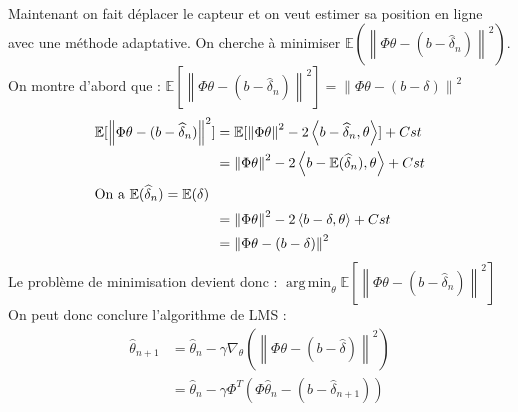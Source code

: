 \documentclass{article}
\begin{document}
\paragraph{} Maintenant on fait d\'eplacer le capteur et on veut estimer sa position en ligne avec une m\'ethode adaptative. On cherche \`a minimiser $\mathbb{E}(\left\|\Phi\theta - (b - \widehat{\delta}_{n})\right\|^{2})$.
On montre d'abord que : $\mathbb{E}[\left\|\Phi\theta - (b - \widehat{\delta}_{n})\right\|^{2}] = \left\|\Phi\theta - (b - \delta)\right\|^{2} $
\begin{align*}
\mathbb{E}[\left\|\Phi\theta - (b - \widehat{\delta}_{n})\right\|^{2}] &= \mathbb{E}[\left\|\Phi\theta\right\|^{2}-2\left\langle b-\widehat{\delta}_{n},\theta\right\rangle] + Cst \\
          &= \left\|\Phi\theta\right\|^{2} -2\left\langle b-\mathbb{E}(\widehat{\delta}_{n}),\theta\right\rangle + Cst \\
					\intertext{On a $\mathbb{E}(\widehat{\delta}_{n})=\mathbb{E}(\delta)$}
					&= \left\|\Phi\theta\right\|^{2} -2\left\langle b-\delta,\theta\right\rangle + Cst \\
					&= \left\|\Phi\theta - (b - \delta)\right\|^{2} 
\end{align*}
Le probl\`eme de minimisation devient donc : $\operatorname{arg\,min}_\theta \mathbb{E}[\left\|\Phi\theta - (b - \widehat{\delta}_{n})\right\|^{2}] $
On peut donc conclure l'algorithme de LMS :
\begin{align*}
\widehat{\theta}_{n+1} &= \widehat{\theta}_{n} - \gamma\nabla_{\theta}(\left\|\Phi\theta - (b - \widehat{\delta})\right\|^{2}) \\
											 &= \widehat{\theta}_{n} - \gamma\Phi^{T}(\Phi\widehat{\theta}_{n} - (b-\widehat{\delta}_{n+1})) \\
\end{align*}
\end{document}
